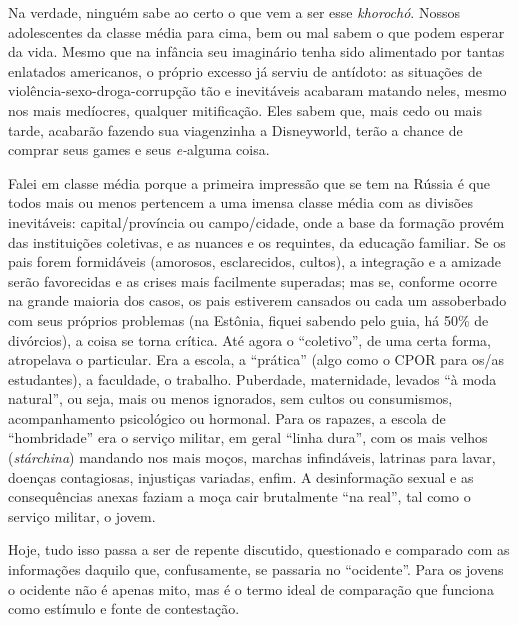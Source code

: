 Na verdade, ninguém sabe ao certo o que vem a ser esse \emph{khorochó}.
Nossos adolescentes da classe média para cima, bem ou mal sabem o que
podem esperar da vida. Mesmo que na infância seu imaginário tenha sido
alimentado por tantas enlatados americanos, o próprio excesso já serviu
de antídoto: as situações de violência-sexo-droga-corrupção tão e
inevitáveis acabaram matando neles, mesmo nos mais medíocres, qualquer
mitificação. Eles sabem que, mais cedo ou mais tarde, acabarão fazendo
sua viagenzinha a Disneyworld, terão a chance de comprar seus games e
seus \emph{e-}alguma coisa.

Falei em classe média porque a primeira impressão que se tem na Rússia é
que todos mais ou menos pertencem a uma imensa classe média com as
divisões inevitáveis: capital/província ou campo/cidade, onde a base da
formação provém das instituições coletivas, e as nuances e os requintes,
da educação familiar. Se os pais forem formidáveis (amorosos,
esclarecidos, cultos), a integração e a amizade serão favorecidas e as
crises mais facilmente superadas; mas se, conforme ocorre na grande
maioria dos casos, os pais estiverem cansados ou cada um assoberbado com
seus próprios problemas (na Estônia, fiquei sabendo pelo guia, há 50\%
de divórcios), a coisa se torna crítica. Até agora o ``coletivo'', de
uma certa forma, atropelava o particular. Era a escola, a ``prática''
(algo como o CPOR para os/as estudantes), a faculdade, o trabalho.
Puberdade, maternidade, levados ``à moda natural'', ou seja, mais ou
menos ignorados, sem cultos ou consumismos, acompanhamento psicológico
ou hormonal. Para os rapazes, a escola de ``hombridade'' era o serviço
militar, em geral ``linha dura'', com os mais velhos (\emph{stárchina})
mandando nos mais moços, marchas infindáveis, latrinas para lavar,
doenças contagiosas, injustiças variadas, enfim. A desinformação sexual
e as consequências anexas faziam a moça cair brutalmente ``na real'',
tal como o serviço militar, o jovem.

Hoje, tudo isso passa a ser de repente discutido, questionado e
comparado com as informações daquilo que, confusamente, se passaria no
``ocidente''. Para os jovens o ocidente não é apenas mito, mas é o termo
ideal de comparação que funciona como estímulo e fonte de contestação.

